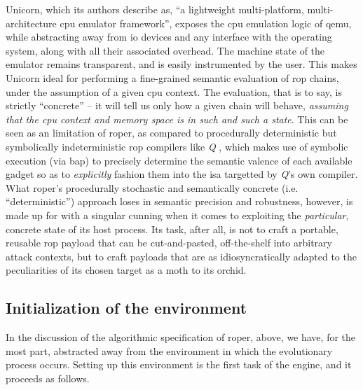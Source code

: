 \documentclass[12pt,glossary]{dalthesis}
\begin{document}
Unicorn, which its authors describe as, ``a lightweight multi-platform,
multi-architecture \gls{cpu} emulator framework'', exposes the \gls{cpu}
emulation logic of \gls{qemu}, while abstracting away from \gls{io} devices and any
interface with the operating system, along with all their associated overhead.
The machine state of the emulator remains transparent, and is easily
instrumented by the user. This makes Unicorn ideal for performing a fine-grained
semantic evaluation of \gls{rop} chains, under the assumption of a given \gls{cpu}
context. The evaluation, that is to say, is strictly ``concrete'' -- it will tell
us only how a given chain will behave, \emph{assuming that the \gls{cpu} context and
memory space is in such and such a state}. This can be seen as an limitation of
\gls{roper}, as compared to procedurally deterministic but symbolically
indeterministic \gls{rop} compilers like \emph{Q} \cite{schwartz11}, which makes use of symbolic
execution (via \gls{bap}) to precisely determine the semantic valence of each
available gadget so as to \emph{explicitly} fashion them into the \gls{isa} targetted
by \emph{Q}'s own compiler. What \gls{roper}'s procedurally stochastic and
semantically concrete (i.e. ``deterministic'') approach loses in semantic
precision and robustness, however, is made up for with a singular cunning when
it comes to exploiting the \emph{particular}, concrete state of its host process. Its
task, after all, is not to craft a portable, reusable \gls{rop} payload that can
be cut-and-pasted, off-the-shelf into arbitrary attack contexts, but to craft
payloads that are as idiosyncratically adapted to the peculiarities of its
chosen target as a moth to its orchid.

\subsection{Initialization of the environment}
\label{sec:orgd7c3f42}
In the discussion of the algorithmic specification of \gls{roper}, above,
we have, for the most part, abstracted away from the environment in which
the evolutionary process occurs. Setting up this environment is the first
task of the engine, and it proceeds as follows.
\end{document}
